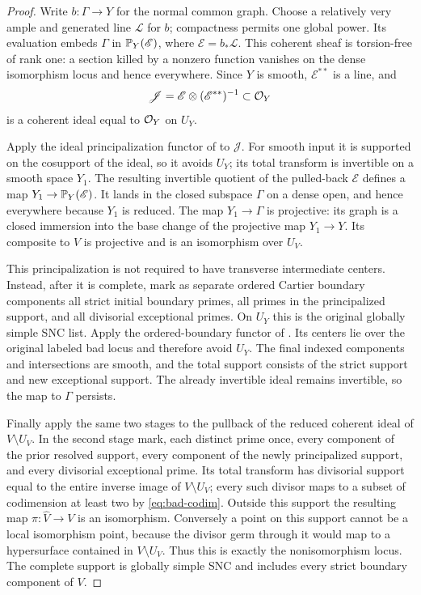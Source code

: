 \begin{proof}
Write \(b:\Gamma\to Y\) for the normal common graph.  Choose a relatively
very ample and generated line \(\mathscr L\) for \(b\); compactness permits
one global power.  Its evaluation embeds \(\Gamma\) in
\(\mathbb P_Y(\mathscr E)\), where \(\mathscr E=b_*\mathscr L\).  This coherent
sheaf is torsion-free of rank one: a section killed by a nonzero function
vanishes on the dense isomorphism locus and hence everywhere.  Since \(Y\)
is smooth, \(\mathscr E^{**}\) is a line, and
\[
 \mathscr J=\mathscr E\otimes(\mathscr E^{**})^{-1}\subset\mathcal O_Y
\]
is a coherent ideal equal to \(\mathcal O_Y\) on \(U_Y\).

Apply the ideal principalization functor of
\cite[Theorems~1.1.11 and~1.1.13]{Temkin2017} to \(\mathscr J\).
For smooth input it is supported on the cosupport of the ideal, so it
avoids \(U_Y\); its total transform is invertible on a smooth space
\(Y_1\).  The resulting invertible quotient of the pulled-back
\(\mathscr E\) defines a map \(Y_1\to\mathbb P_Y(\mathscr E)\).  It lands
in the closed subspace \(\Gamma\) on a dense open, and hence everywhere
because \(Y_1\) is reduced.  The map \(Y_1\to\Gamma\) is projective:
its graph is a closed immersion into the base change of the projective
map \(Y_1\to Y\).  Its composite to \(V\) is projective and is an
isomorphism over \(U_V\).

This principalization is not required to have transverse intermediate
centers.  Instead, after it is complete, mark as separate ordered Cartier
boundary components all strict initial boundary primes, all primes in the
principalized support, and all divisorial exceptional primes.  On \(U_Y\)
this is the original globally simple SNC list.  Apply the ordered-boundary
functor of \cite[Theorems~1.1.3 and~1.1.13]{Temkin2017}.  Its centers
lie over the original labeled bad locus and therefore avoid \(U_Y\).
The final indexed components and intersections are smooth, and the total
support consists of the strict support and new exceptional support.
The already invertible ideal remains invertible, so the map to \(\Gamma\)
persists.

Finally apply the same two stages to the pullback of the reduced coherent
ideal of \(V\setminus U_V\).  In the second stage mark, each distinct
prime once, every component of the prior resolved support, every component
of the newly principalized support, and every divisorial exceptional
prime.  Its total transform has divisorial support equal to
the entire inverse image of \(V\setminus U_V\); every such divisor maps
to a subset of codimension at least two by \eqref{eq:bad-codim}.  Outside
this support the resulting map \(\pi:\widehat V\to V\) is an
isomorphism.  Conversely a point on this support cannot be a local
isomorphism point, because the divisor germ through it would map to a
hypersurface contained in \(V\setminus U_V\).  Thus this is exactly the
nonisomorphism locus.  The complete support is globally simple SNC and
includes every strict boundary component of \(V\).


\end{proof}
